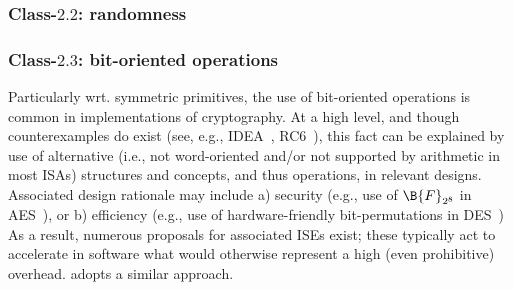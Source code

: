 

\subsubsection{Class-$2.2$: randomness}
\label{sec:bg:feature:2:2}

%
%
%


\subsubsection{Class-$2.3$: bit-oriented            operations}
\label{sec:bg:feature:2:3}

Particularly wrt. symmetric primitives, the use of bit-oriented operations 
is common in implementations of cryptography.  At a high level, and though 
counterexamples do exist 
(see, e.g., IDEA~\cite{SCARV:LaiMas:90}, RC6~\cite{SCARV:RRSY:98}),
this fact can be explained by use of alternative (i.e., not word-oriented
and/or not supported by arithmetic in most ISAs) structures and concepts,
and thus operations, in relevant designs.  Associated design rationale may
include
a) security
   (e.g., use of $\B{F}_{2^8}$ in AES~\cite{SCARV:FIPS:197}),
   or
b) efficiency
   (e.g., use of hardware-friendly bit-permutations in DES~\cite{SCARV:FIPS:46_3})
As a result, numerous proposals for associated ISEs exist; these typically
act to accelerate in software what would otherwise represent a high (even 
prohibitive) overhead.  \XCID adopts a similar approach.

